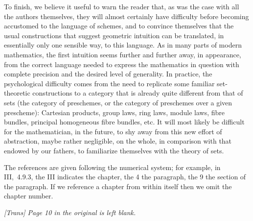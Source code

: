 \sectionbreak

To finish, we believe it useful to warn the reader that, as was the case with
all the authors themselves, they will almost certainly have difficulty before
becoming accustomed to the language of schemes, and to convince themselves that
the usual constructions that suggest geometric intuition can be translated, in
essentially only one sensible way, to this language. As in many parts of modern
mathematics, the first intuition seems further and further away, in appearance,
from the correct language needed to express the mathematics in question with
complete precision and the desired level of generality. In practice, the
psychological difficulty comes from the need to replicate some familiar
set-theoretic constructions to a category that is already quite different from
that of sets (the category of preschemes, or the category of preschemes over a
given prescheme): Cartesian products, group laws, ring laws, module laws, fibre
bundles, principal homogeneous fibre bundles, etc. It will most likely
be difficult for the mathematician, in the future, to shy away from this new
effort of abstraction, maybe rather negligible, on the whole, in comparison with
that endowed by our fathers, to familiarize themselves with the theory of sets.

\sectionbreak

The references are given following the numerical system; for example, in
III,~4.9.3, the III indicates the chapter, the 4 the paragraph, the 9 the
section of the paragraph. If we reference a chapter from within itself then we
omit the chapter number.

\bigskip

{\it [Trans] Page 10 in the original is left blank.}






